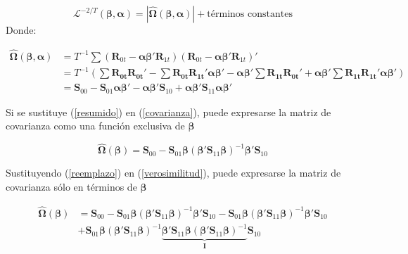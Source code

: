 \documentclass[12pt, twoside]{book}\usepackage[]{graphicx}\usepackage[]{color}
\numberwithin{equation}{section}
\numberwithin{theorem}{section}
\numberwithin{teorema}{section}
\numberwithin{defi}{section}
\numberwithin{prop}{section}
\numberwithin{defi}{section}
\theoremstyle{plain}
\begin{document}
\begin{equation}\label{reemplazo}
\mathcal{L}^{-2/T}(\boldsymbol{\beta,\alpha})=|\hat{\boldsymbol{\Omega}}(\boldsymbol{\beta,\alpha})|+\text{términos constantes}
\end{equation}
Donde: 

\begin{align}\label{covarianza}
\hat{\boldsymbol{\Omega}}(\boldsymbol{\beta,\alpha}) & = T^{-1}\sum (\mathbf{R}_{0t}-\boldsymbol{\alpha\beta}'\mathbf{R}_{1t})(\mathbf{R}_{0t}-\boldsymbol{\alpha\beta}'\mathbf{R}_{1t})' \\ 
& = T^{-1}(\sum \mathbf{R_{0t}R_{0t}}'-\sum \mathbf{R_{0t}R_{1t}}'\boldsymbol{\alpha\beta}'-\boldsymbol{\alpha\beta}'\sum \mathbf{R_{1t}R_{0t}}'+\boldsymbol{\alpha\beta}'\sum \mathbf{R_{1t}R_{1t}}'\boldsymbol{\alpha\beta}') \\ 
& = \mathbf{S}_{00}-\mathbf{S}_{01}\boldsymbol{\alpha\beta}'-\boldsymbol{\alpha\beta}'\mathbf{S}_{10}+\boldsymbol{\alpha\beta}'\mathbf{S}_{11}\boldsymbol{\alpha\beta}'
\end{align}

Si se sustituye (\ref{resumido}) en (\ref{covarianza}), puede expresarse la matriz de covarianza como una función exclusiva de $\boldsymbol{\beta}$ 

\begin{equation}\label{verosimilitud}
\hat{\boldsymbol{\Omega}}(\boldsymbol{\beta})= \mathbf{S}_{00}-\mathbf{S}_{01}\boldsymbol{\beta}(\boldsymbol{\beta}'\mathbf{S}_{11}\boldsymbol{\beta})^{-1}\boldsymbol{\beta}'\mathbf{S}_{10}
\end{equation}


Sustituyendo (\ref{reemplazo}) en (\ref{verosimilitud}), puede expresarse la matriz de covarianza sólo en términos de $\boldsymbol{\beta}$

\begin{align}
\hat{\boldsymbol{\Omega}}(\boldsymbol{\beta}) & = \mathbf{S}_{00}-\mathbf{S}_{01}\boldsymbol{\beta}(\boldsymbol{\beta}'\mathbf{S}_{11}\boldsymbol{\beta})^{-1}\boldsymbol{\beta}'\mathbf{S}_{10}-\mathbf{S}_{01}\boldsymbol{\beta}(\boldsymbol{\beta}'\mathbf{S}_{11}\boldsymbol{\beta})^{-1}\boldsymbol{\beta}'\mathbf{S}_{10} \\ 
& +\mathbf{S}_{01}\boldsymbol{\beta}(\boldsymbol{\beta}'\mathbf{S}_{11}\boldsymbol{\beta})^{-1}\underbrace{\boldsymbol{\beta}'\mathbf{S}_{11}\boldsymbol{\beta}(\boldsymbol{\beta}'\mathbf{S}_{11}\boldsymbol{\beta})^{-1}}_{\mathbf{I}}\mathbf{S}_{10}
\end{align}
\end{document}
